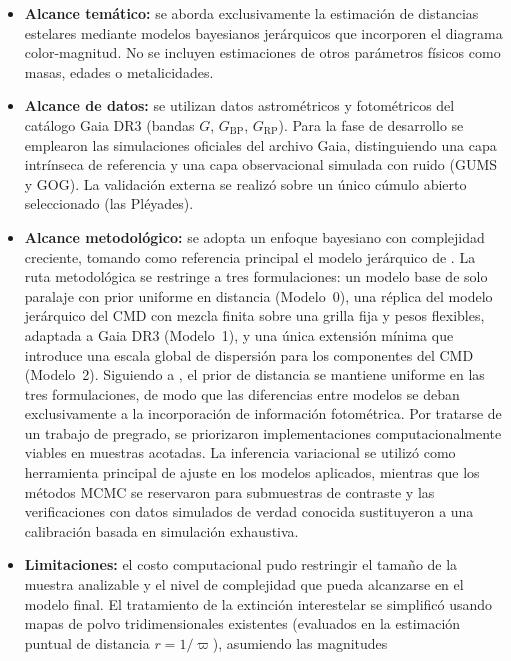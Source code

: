 \documentclass[stu, 12pt, letterpaper, donotrepeattitle, floatsintext, natbib]{apa7_ula}
\begin{document}
\begin{itemize}
    \item \textbf{Alcance temático:} se aborda exclusivamente la
    estimación de distancias estelares mediante modelos bayesianos
    jerárquicos que incorporen el diagrama color-magnitud. No se
    incluyen estimaciones de otros parámetros físicos como masas,
    edades o metalicidades.
    \item \textbf{Alcance de datos:} se utilizan datos astrométricos
    y fotométricos del catálogo Gaia DR3 (bandas $G$, $G_{\text{BP}}$,
    $G_{\text{RP}}$). Para la fase de desarrollo se emplearon las
    simulaciones oficiales del archivo Gaia, distinguiendo una capa
    intrínseca de referencia y una capa observacional simulada con
    ruido (GUMS y GOG). La validación externa se realizó sobre un único
    cúmulo abierto seleccionado (las Pléyades).
    \item \textbf{Alcance metodológico:} se adopta un enfoque
    bayesiano con complejidad creciente, tomando como referencia
    principal el modelo jerárquico de \citet{Leistedt_2017}. La ruta
    metodológica se restringe a tres formulaciones: un modelo base de
    solo paralaje con prior uniforme en distancia (Modelo~0), una
    réplica del modelo jerárquico del CMD con mezcla finita sobre una
    grilla fija y pesos flexibles, adaptada a Gaia DR3 (Modelo~1), y
    una única extensión mínima que introduce una
    escala global de dispersión para los componentes del CMD
    (Modelo~2). Siguiendo a \citet{Leistedt_2017}, el prior de
    distancia se mantiene uniforme en las tres formulaciones, de modo
    que las diferencias entre modelos se deban exclusivamente a la
    incorporación de información fotométrica. Por
    tratarse de un trabajo de pregrado, se priorizaron
    implementaciones computacionalmente viables en muestras acotadas.
    La inferencia variacional se utilizó como herramienta principal
    de ajuste en los modelos aplicados, mientras que los métodos MCMC
    se reservaron para submuestras de contraste y las verificaciones
    con datos simulados de verdad conocida sustituyeron a una
    calibración basada en simulación exhaustiva.
    \item \textbf{Limitaciones:} el costo computacional pudo
    restringir el tamaño de la muestra analizable y el nivel de
    complejidad que pueda alcanzarse en el modelo final. El
    tratamiento de la extinción interestelar se simplificó usando
    mapas de polvo tridimensionales existentes (evaluados en la estimación
    puntual de distancia $r = 1/\varpi$), asumiendo las magnitudes

\end{itemize}
\end{document}
